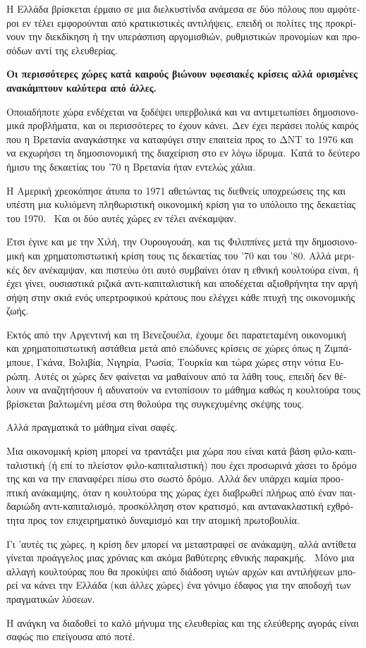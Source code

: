 \documentclass[11pt, twocolumn]{scrartcl}
\begin{document}
\begin{otherlanguage}{greek}
Η Ελλάδα βρίσκεται έρμαιο σε μια διελκυστίνδα ανάμεσα σε δύο πόλους που αμφότεροι εν τέλει εμφορούνται από κρατικιστικές αντιλήψεις, επειδή οι πολίτες της προκρίνουν την διεκδίκηση ή την υπεράσπιση αργομισθιών, ρυθμιστικών προνομίων και προσόδων αντί της ελευθερίας.

\textbf{Οι περισσότερες χώρες κατά καιρούς βιώνουν υφεσιακές κρίσεις αλλά ορισμένες ανακάμπτουν καλύτερα από άλλες.}

Οποιαδήποτε χώρα ενδέχεται να ξοδέψει υπερβολικά και να αντιμετωπίσει δημοσιονομικά προβλήματα, και οι περισσότερες το έχουν κάνει.
Δεν έχει περάσει πολύς καιρός που η Βρετανία αναγκάστηκε να καταφύγει στην επαιτεία προς το ΔΝΤ το 1976 και να εκχωρήσει τη δημοσιονομική της διαχείριση στο εν λόγω ίδρυμα. Κατά το δεύτερο ήμισυ της δεκαετίας του '70 η Βρετανία ήταν εντελώς χάλια.

Η Αμερική χρεοκόπησε άτυπα το 1971 αθετώντας τις διεθνείς υποχρεώσεις της και υπέστη μια κυλιόμενη πληθωριστική οικονομική κρίση για το υπόλοιπο της δεκαετίας του 1970. 
Και οι δύο αυτές χώρες εν τέλει ανέκαμψαν.

Έτσι έγινε και με την Χιλή, την Ουρουγουάη, και τις Φιλιππίνες μετά την δημοσιονομική και χρηματοπιστωτική κρίση τους τις δεκαετίας του '70 και του '80.
Αλλά μερικές δεν ανέκαμψαν, και πιστεύω ότι αυτό συμβαίνει όταν η εθνική κουλτούρα είναι, ή έχει γίνει, ουσιαστικά ριζικά αντι-καπιταλιστική και αποδέχεται αξιοθρήνητα την αργή σήψη στην σκιά ενός υπερτροφικού κράτους που ελέγχει κάθε πτυχή της οικονομικής ζωής.

Εκτός από την Αργεντινή και τη Βενεζουέλα, έχουμε δει παρατεταμένη οικονομική και χρηματοπιστωτική αστάθεια μετά από επώδυνες κρίσεις σε χώρες όπως η Ζιμπάμπουε, Γκάνα, Βολιβία, Νιγηρία, Ρωσία, Τουρκία και τώρα χώρες στην νότια Ευρώπη.
Αυτές οι χώρες δεν φαίνεται να μαθαίνουν από τα λάθη τους, επειδή δεν θέλουν να αναζητήσουν ή αδυνατούν να εντοπίσουν το μάθημα καθώς η κουλτούρα τους βρίσκεται βαλτωμένη μέσα στη θολούρα της συγκεχυμένης σκέψης τους.

Αλλά πραγματικά το μάθημα είναι σαφές.

Μια οικονομική κρίση μπορεί να τραντάξει μια χώρα που είναι κατά βάση φιλο-καπιταλιστική (ή επί το πλείστον φιλο-καπιταλιστική) που έχει προσωρινά χάσει το δρόμο της και να την επαναφέρει πίσω στο σωστό δρόμο.
Αλλά δεν υπάρχει καμία προοπτική ανάκαμψης, όταν η κουλτούρα της χώρας έχει διαβρωθεί πλήρως από έναν παιδαριώδη αντι-καπιταλισμό, προσκόλληση στον κρατισμό, και αντανακλαστική εχθρότητα προς τον επιχειρηματικό δυναμισμό και την ατομική πρωτοβουλία.

Γι 'αυτές τις χώρες, η κρίση δεν μπορεί να μεταστραφεί σε ανάκαμψη, αλλά αντίθετα γίνεται προάγγελος μιας χρόνιας και ακόμα βαθύτερης εθνικής παρακμής. 
Μόνο μια αλλαγή κουλτούρας που θα προκύψει από διάδοση υγιών αρχών και αντιλήψεων μπορεί να κάνει την Ελλάδα (και άλλες χώρες) ένα γόνιμο έδαφος για την αποδοχή των πραγματικών λύσεων.

Η ανάγκη να διαδοθεί το καλό μήνυμα της ελευθερίας και της ελεύθερης αγοράς είναι σαφώς πιο επείγουσα από ποτέ.


\end{otherlanguage}
\end{document}
